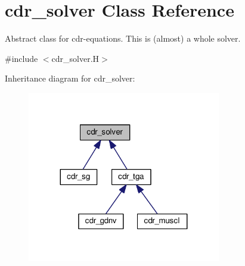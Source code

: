 \hypertarget{classcdr__solver}{}\section{cdr\+\_\+solver Class Reference}
\label{classcdr__solver}


Abstract class for cdr-\/equations. This is (almost) a whole solver.  




{\ttfamily \#include $<$cdr\+\_\+solver.\+H$>$}



Inheritance diagram for cdr\+\_\+solver\+:\nopagebreak
\begin{figure}[H]
\begin{center}
\leavevmode
\includegraphics[width=239pt]{classcdr__solver__inherit__graph}
\end{center}
\end{figure}
